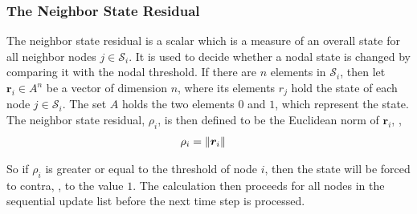 \subsubsection{The Neighbor State Residual}
\label{sec:nbrStateRes}

The neighbor state residual is a scalar which is a measure of an overall state
for all neighbor nodes $j\in\mathcal{S}_i$.  It is used to decide whether a
nodal state is changed by comparing it with the nodal threshold.  If there are
$n$ elements in $\mathcal{S}_i$, then let $\bm{r}_i\in A^n$ be a vector of
dimension $n$, where its elements $r_j$ hold the state of each node
$j\in\mathcal{S}_i$.  The set $A$ holds the two elements $0$ and $1$, which
represent the state.  The neighbor state residual, $\rho_i$, is then defined to
be the Euclidean norm of $\bm{r}_i$, \ie,
\begin{align}
  \label{eq:nbrStateRes}
  \rho_i &= \lVert\bm{r}_i\rVert
\end{align}

So if $\rho_i$ is greater or equal to the threshold of node $i$, then the state
will be forced to contra, \ie, to the value $1$.  The calculation then proceeds
for all nodes in the sequential update list before the next time step is
processed.



